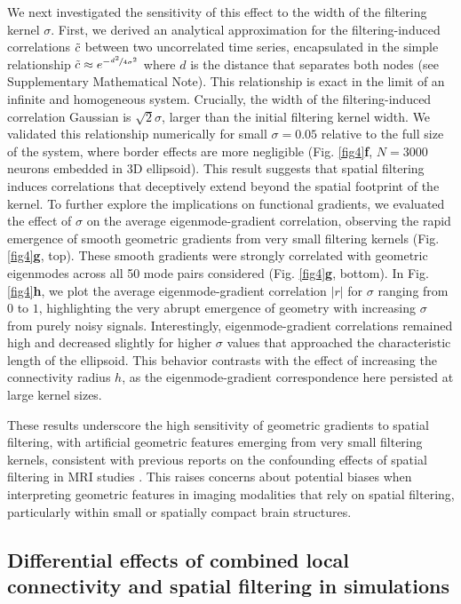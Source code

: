 \documentclass{article}
\begin{document}
 We next investigated the sensitivity of this effect to the width of the filtering kernel $\sigma$. First, we derived an analytical approximation for the filtering-induced correlations $\Tilde{c}$ between two uncorrelated time series, encapsulated in the simple relationship $\Tilde{c}\approx e^{-\nicefrac{d^2}{4\sigma^2}}$ where $d$ is the distance that separates both nodes (see Supplementary Mathematical Note). This relationship is exact in the limit of an infinite and homogeneous system. Crucially, the width of the filtering-induced correlation Gaussian is $\sqrt{2}\sigma$, larger than the initial filtering kernel width. We validated this relationship numerically for small $\sigma=0.05$ relative to the full size of the system, where border effects are more negligible (Fig. \ref{fig4}\textbf{f}, $N=3000$ neurons embedded in 3D ellipsoid). This result suggests that spatial filtering induces correlations that deceptively extend beyond the spatial footprint of the kernel. To further explore the implications on functional gradients, we evaluated the effect of $\sigma$ on the average eigenmode-gradient correlation, observing the rapid emergence of smooth geometric gradients from very small filtering kernels (Fig. \ref{fig4}\textbf{g}, top). These smooth gradients were strongly correlated with geometric eigenmodes across all 50 mode pairs considered (Fig. \ref{fig4}\textbf{g}, bottom). In Fig. \ref{fig4}\textbf{h}, we plot the average eigenmode-gradient correlation $|r|$ for $\sigma$ ranging from $0$ to $1$, highlighting the very abrupt emergence of geometry with increasing $\sigma$ from purely noisy signals. Interestingly, eigenmode-gradient correlations remained high and decreased slightly for higher $\sigma$ values that approached the characteristic length of the ellipsoid. This behavior contrasts with the effect of increasing the connectivity radius $h$, as the eigenmode-gradient correspondence here persisted at large kernel sizes.
 
 These results underscore the high sensitivity of geometric gradients to spatial filtering, with artificial geometric features emerging from very small filtering kernels, consistent with previous reports on the confounding effects of spatial filtering in MRI studies \cite{watson2023connectopic}. This raises concerns about potential biases when interpreting geometric features in imaging modalities that rely on spatial filtering, particularly within small or spatially compact brain structures.

\subsection*{Differential effects of combined local connectivity and spatial filtering in simulations}
\end{document}
